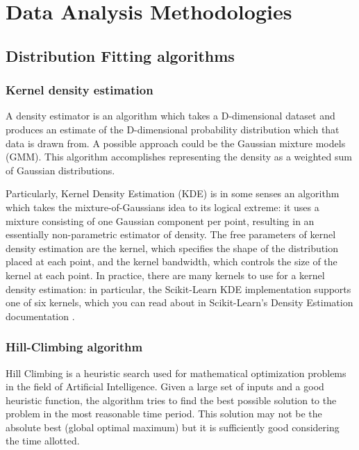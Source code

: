 \section{Data Analysis Methodologies}
\label{sub:data_analysis_methodologies}

\subsection{Distribution Fitting algorithms}

\subsubsection{Kernel density estimation}
\label{subsub:kernel_density}

 A density estimator is an algorithm which takes a D-dimensional dataset and produces an estimate of the D-dimensional probability distribution which that data is drawn from. A possible approach could be the Gaussian mixture models (GMM). This algorithm accomplishes representing the density as a weighted sum of Gaussian distributions.
 
 Particularly, Kernel Density Estimation (KDE) is in some senses an algorithm which takes the mixture-of-Gaussians idea to its logical extreme: it uses a mixture consisting of one Gaussian component per point, resulting in an essentially non-parametric estimator of density. 
The free parameters of kernel density estimation are the kernel, which specifies the shape of the distribution placed at each point, and the kernel bandwidth, which controls the size of the kernel at each point. In practice, there are many kernels to use for a kernel density estimation: in particular, the Scikit-Learn KDE implementation supports one of six kernels, which you can read about in Scikit-Learn's Density Estimation documentation \cite{KernelDensityEstimation}.

\subsubsection{Hill-Climbing algorithm}
\label{subsub:hill_climbing_algorithm}
Hill Climbing is a heuristic search used for mathematical optimization problems in the field of Artificial Intelligence. Given a large set of inputs and a good heuristic function, the algorithm tries to find the best possible solution to the problem in the most reasonable time period. This solution may not be the absolute best (global optimal maximum) but it is sufficiently good considering the time allotted\cite{Kvasnicka1995HillCW}.

